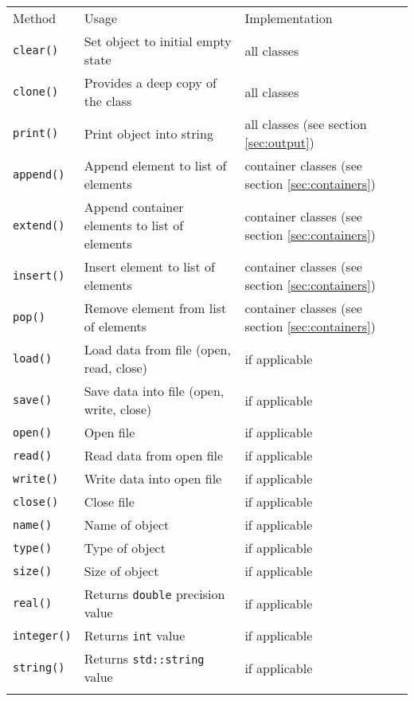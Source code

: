 \documentclass{article}[12pt,a4]
\begin{document}
\begin{center}
\begin{tabular}{lll}
\hline
\hline
\noalign{\smallskip}
Method & Usage & Implementation \\
\noalign{\smallskip}
\hline
\noalign{\smallskip}
{\tt clear()} & Set object to initial empty state & all classes \\
{\tt clone()} & Provides a deep copy of the class & all classes \\
{\tt print()} & Print object into string & all classes (see section \ref{sec:output}) \\
\noalign{\smallskip}
\hline
\noalign{\smallskip}
{\tt append()} & Append element to list of elements & container classes (see section \ref{sec:containers}) \\
{\tt extend()} & Append container elements to list of elements & container classes (see section \ref{sec:containers}) \\
{\tt insert()} & Insert element to list of elements & container classes (see section \ref{sec:containers}) \\
{\tt pop()} & Remove element from list of elements & container classes (see section \ref{sec:containers}) \\
\noalign{\smallskip}
\hline
\noalign{\smallskip}
{\tt load()} & Load data from file (open, read, close) & if applicable \\
{\tt save()} & Save data into file (open, write, close) & if applicable \\
{\tt open()} & Open file & if applicable \\
{\tt read()} & Read data from open file & if applicable \\
{\tt write()} & Write data into open file & if applicable \\
{\tt close()} & Close file & if applicable \\
{\tt name()} & Name of object & if applicable \\
{\tt type()} & Type of object & if applicable \\
{\tt size()} & Size of object & if applicable \\
{\tt real()} & Returns {\tt double} precision value & if applicable \\
{\tt integer()} & Returns {\tt int} value & if applicable \\
{\tt string()} & Returns {\tt std::string} value & if applicable \\
\noalign{\smallskip}
\hline
\end{tabular}
\end{center}
\end{document}
